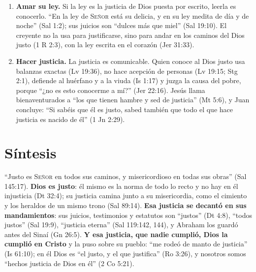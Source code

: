 \documentclass[11pt,letterpaper]{article}
\newcommand{\SENOR}{\textsc{Señor}}
\begin{document}
\begin{enumerate}
\item \textbf{Amar su ley.} Si la ley es la justicia de Dios puesta por escrito, leerla es conocerlo. ``En la ley de \SENOR{} está su delicia, y en su ley medita de día y de noche'' (Sal 1:2); sus juicios son ``dulces más que miel'' (Sal 19:10). El creyente no la usa para justificarse, sino para andar en los caminos del Dios justo (1 R 2:3), con la ley escrita en el corazón (Jer 31:33).

\item \textbf{Hacer justicia.} La justicia es comunicable. Quien conoce al Dios justo usa balanzas exactas (Lv 19:36), no hace acepción de personas (Lv 19:15; Stg 2:1), defiende al huérfano y a la viuda (Is 1:17) y juzga la causa del pobre, porque ``¿no es esto conocerme a mí?'' (Jer 22:16). Jesús llama bienaventurados a ``los que tienen hambre y sed de justicia'' (Mt 5:6), y Juan concluye: ``Si sabéis que él es justo, sabed también que todo el que hace justicia es nacido de él'' (1 Jn 2:29).
\end{enumerate}

\section{Síntesis}

``Justo es \SENOR{} en todos sus caminos, y misericordioso en todas sus obras'' (Sal 145:17). \textbf{Dios es justo}: él mismo es la norma de todo lo recto y no hay en él injusticia (Dt 32:4); su justicia camina junto a su misericordia, como el cimiento y los heraldos de un mismo trono (Sal 89:14). \textbf{Esa justicia se decantó en sus mandamientos}: sus juicios, testimonios y estatutos son ``justos'' (Dt 4:8), ``todos justos'' (Sal 19:9), ``justicia eterna'' (Sal 119:142, 144), y Abraham los guardó antes del Sinaí (Gn 26:5). \textbf{Y esa justicia, que nadie cumplió, Dios la cumplió en Cristo} y la puso sobre su pueblo: ``me rodeó de manto de justicia'' (Is 61:10); en él Dios es ``el justo, y el que justifica'' (Ro 3:26), y nosotros somos ``hechos justicia de Dios en él'' (2 Co 5:21).
\end{document}
